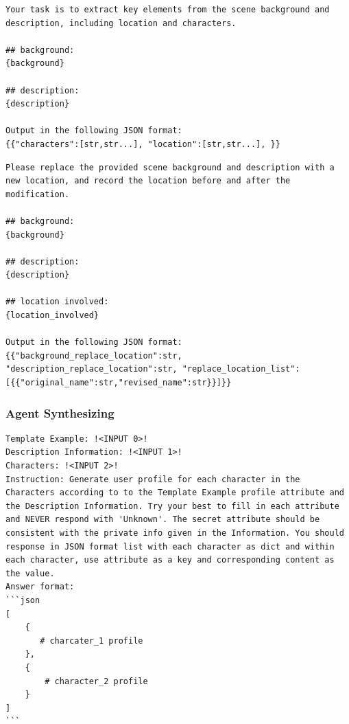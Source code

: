\begin{tcolorbox}[width=\linewidth]
\begin{lstlisting}[caption=Entity Word Extraction]
Your task is to extract key elements from the scene background and description, including location and characters.

## background:
{background}

## description:
{description}

Output in the following JSON format:
{{"characters":[str,str...], "location":[str,str...], }}
\end{lstlisting}
\end{tcolorbox}

\begin{tcolorbox}[width=\linewidth]
\begin{lstlisting}[caption=Entity Word Replacement]
Please replace the provided scene background and description with a new location, and record the location before and after the modification.

## background:
{background}

## description:
{description}

## location involved:
{location_involved}

Output in the following JSON format:
{{"background_replace_location":str, "description_replace_location":str, "replace_location_list":[{{"original_name":str,"revised_name":str}}]}}

\end{lstlisting}
\end{tcolorbox}

\subsubsection{Agent Synthesizing}\label{app:profile_prompt}
\begin{tcolorbox}[width=\linewidth]
\begin{lstlisting}[caption=Attribute Extraction of Original Characters]
Template Example: !<INPUT 0>!
Description Information: !<INPUT 1>!
Characters: !<INPUT 2>!
Instruction: Generate user profile for each character in the Characters according to to the Template Example profile attribute and the Description Information. Try your best to fill in each attribute and NEVER respond with 'Unknown'. The secret attribute should be consistent with the private info given in the Information. You should response in JSON format list with each character as dict and within each character, use attribute as a key and corresponding content as the value.
Answer format:
```json
[
    {
       # charcater_1 profile 
    },
    {
        # character_2 profile
    }
]
```
\end{lstlisting}
\end{tcolorbox}

